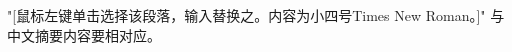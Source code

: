 \begin{englishabstract}

	\noindent{} 
	
	\noindent "[鼠标左键单击选择该段落，输入替换之。内容为小四号Times New Roman。]" 与中文摘要内容要相对应。 \par

	\vspace{2cm}
	
	\noindent {} 
\end{englishabstract}